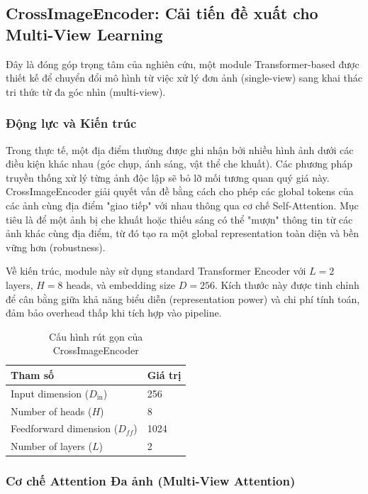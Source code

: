 \documentclass[12pt,a4paper]{article}
\begin{document}
    \subsection{CrossImageEncoder: Cải tiến đề xuất cho Multi-View Learning}

    Đây là đóng góp trọng tâm của nghiên cứu, một module Transformer-based được thiết kế để chuyển đổi mô hình từ việc xử lý đơn ảnh (single-view) sang khai thác tri thức từ đa góc nhìn (multi-view).

    \subsubsection{Động lực và Kiến trúc}

    Trong thực tế, một địa điểm thường được ghi nhận bởi nhiều hình ảnh dưới các điều kiện khác nhau (góc chụp, ánh sáng, vật thể che khuất). Các phương pháp truyền thống xử lý từng ảnh độc lập sẽ bỏ lỡ mối tương quan quý giá này. CrossImageEncoder giải quyết vấn đề bằng cách cho phép các global tokens của các ảnh cùng địa điểm "giao tiếp" với nhau thông qua cơ chế Self-Attention. Mục tiêu là để một ảnh bị che khuất hoặc thiếu sáng có thể "mượn" thông tin từ các ảnh khác cùng địa điểm, từ đó tạo ra một global representation toàn diện và bền vững hơn (robustness).

    Về kiến trúc, module này sử dụng standard Transformer Encoder với $L=2$ layers, $H=8$ heads, và embedding size $D=256$. Kích thước này được tinh chỉnh để cân bằng giữa khả năng biểu diễn (representation power) và chi phí tính toán, đảm bảo overhead thấp khi tích hợp vào pipeline.

    \begin{table}[h]
    \centering
    \begin{tabular}{ll}
    \toprule
    \textbf{Tham số} & \textbf{Giá trị} \\
    \midrule
    Input dimension ($D_{\text{in}}$) & 256 \\
    Number of heads ($H$) & 8 \\
    Feedforward dimension ($D_{ff}$) & 1024 \\
    Number of layers ($L$) & 2 \\
    \bottomrule
    \end{tabular}
    \caption{Cấu hình rút gọn của CrossImageEncoder}
    \end{table}

    \subsubsection{Cơ chế Attention Đa ảnh (Multi-View Attention)}
\end{document}
